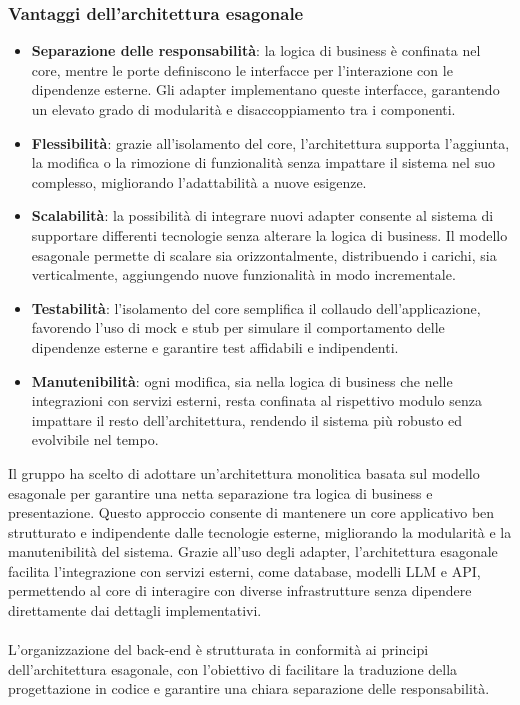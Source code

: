 \subsubsection{Vantaggi dell’architettura esagonale}
\begin{itemize}
    \item \textbf{Separazione delle responsabilità}: la logica di business è confinata nel core, mentre le porte definiscono le interfacce per l'interazione con le dipendenze esterne. Gli adapter implementano queste interfacce, garantendo un elevato grado di modularità e disaccoppiamento tra i componenti.
    \item \textbf{Flessibilità}: grazie all'isolamento del core, l'architettura supporta l'aggiunta, la modifica o la rimozione di funzionalità senza impattare il sistema nel suo complesso, migliorando l'adattabilità a nuove esigenze.
    \item \textbf{Scalabilità}: la possibilità di integrare nuovi adapter consente al sistema di supportare differenti tecnologie senza alterare la logica di business. Il modello esagonale permette di scalare sia orizzontalmente, distribuendo i carichi, sia verticalmente, aggiungendo nuove funzionalità in modo incrementale.
    \item \textbf{Testabilità}: l'isolamento del core semplifica il collaudo dell'applicazione, favorendo l'uso di mock e stub per simulare il comportamento delle dipendenze esterne e garantire test affidabili e indipendenti.
    \item \textbf{Manutenibilità}: ogni modifica, sia nella logica di business che nelle integrazioni con servizi esterni, resta confinata al rispettivo modulo senza impattare il resto dell'architettura, rendendo il sistema più robusto ed evolvibile nel tempo.
\end{itemize}

\noindent
Il gruppo ha scelto di adottare un'architettura monolitica basata sul modello esagonale per garantire una netta separazione tra logica di business e presentazione.
Questo approccio consente di mantenere un core applicativo ben strutturato e indipendente dalle tecnologie esterne, migliorando la modularità e la manutenibilità del sistema.  
Grazie all'uso degli adapter, l'architettura esagonale facilita l'integrazione con servizi esterni, come database, modelli LLM e API, permettendo al core di interagire con diverse infrastrutture senza dipendere direttamente dai dettagli implementativi.\\
\noindent
\\
L'organizzazione del back-end è strutturata in conformità ai principi dell'architettura esagonale, con l'obiettivo di facilitare la traduzione della progettazione in codice e garantire una chiara separazione delle responsabilità.\\

